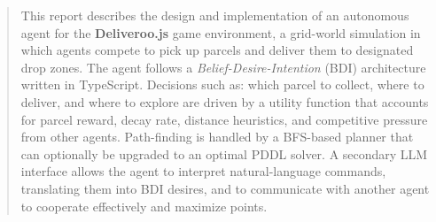 \begin{abstract}
This report describes the design and implementation of an autonomous agent for the \textbf{Deliveroo.js} game environment, a grid-world simulation in which agents compete to pick up parcels and deliver them to designated drop zones.  The agent follows a \emph{Belief-Desire-Intention} (BDI) architecture written in TypeScript.
Decisions such as: which parcel to collect, where to deliver, and where to explore are driven by a utility function that accounts for parcel reward, decay rate, distance heuristics, and competitive pressure from other agents.
Path-finding is handled by a BFS-based planner that can optionally be upgraded to an optimal PDDL solver.
A secondary LLM interface allows the agent to interpret natural-language commands, translating them into BDI desires, and to communicate with another agent to cooperate effectively and maximize points.
\end{abstract}